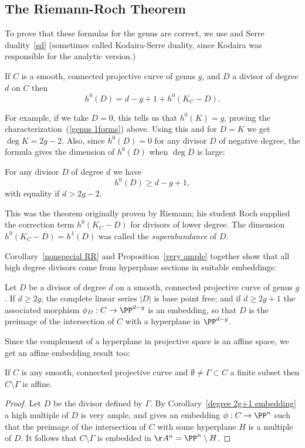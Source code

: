 \subsection{The Riemann-Roch Theorem}

To prove that these formulas for the genus are correct, we use \trr and Serre duality~\ref{sd} (sometimes called Kodaira-Serre duality, since Kodaira was responsible for the analytic version.)

\begin{theorem}\label{RR}
 If $C$ is a smooth, connected projective curve of genus $g$, and $D$ a divisor of degree $d$ on $C$ then
$$
h^0(D) = d - g + 1 + h^0(K_C - D).
$$
\end{theorem}

For example, if we take $D=0$, this tells us that $h^0(K) = g$, proving the characterization~(\ref{genus 1forms}) above. Using this and \trr for $D=K$
we get $\deg K = 2g-2$. Also, since $h^0(D) = 0$ for any divisor $D$ of negative degree, the formula gives the dimension of $h^{0}(D)$ when $\deg D$ is large:

\begin{corollary}\label{nonspecial RR}
For any divisor $D$ of degree $d$ we have
$$
h^0(D) \geq d - g + 1,
$$
with equality if $d > 2g-2$.
\end{corollary}
This was the theorem originally proven by Riemann; his student Roch supplied the correction term $h^0(K_C - D)$ for divisors of lower degree.
The dimension $h^0(K_C-D) = h^1(D)$ was called the \emph{superabundance} of $D$.

Corollary~\ref{nonspecial RR} and Proposition~\ref{very ample} together show that all high degree divisors come from hyperplane sections in 
suitable embeddings:

\begin{corollary}\label{degree 2g+1 embedding}
Let $D$ be a divisor of degree $d$ on a smooth, connected projective curve of genus $g$. If $d \geq 2g$, the complete linear series $|D|$ is base point free; and if $d \geq 2g+1$ the associated morphism $\phi_D : C \to \PP^{d-g}$ is an embedding, so that
$D$ is the preimage of the intersection of $C$ with a hyperplane in $ \PP^{d-g}$.
\end{corollary}

Since the complement of a hyperplane in projective space is an affine space, we get an affine embedding result too:

\begin{corollary}
 If $C$ is any smooth, connected projective curve and $\emptyset \neq \Gamma \subset C$ a finite subset then $C \setminus \Gamma$ is affine.
\end{corollary}
\begin{proof}
Let $D$ be the divisor defined by $\Gamma$. By Corollary~\ref{degree 2g+1 embedding} a high multiple of $D$ is very ample,
and gives an embedding $\phi: C\to \PP^n$ such that the preimage of the intersection of $C$ with some hyperplane $H$
is a multiple of $D$. It follows that $C\setminus \Gamma$ is embedded in $\AA^n = \PP^n\setminus H$.
\end{proof}
 
